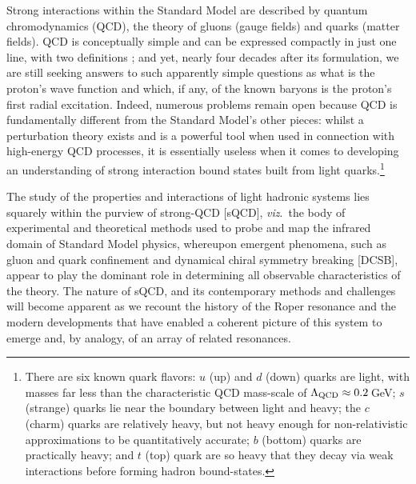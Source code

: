 Strong interactions within the Standard Model are described by quantum chromodynamics (QCD), the theory of gluons (gauge fields) and quarks (matter fields).   QCD is conceptually simple and can be expressed compactly in just one line, with two definitions \cite{Wilczek:2000ih}; and yet, nearly four decades after its formulation, we are still seeking answers to such apparently simple questions as what is the proton's wave function and which, if any, of the known baryons is the proton's first radial excitation.  Indeed, numerous problems remain open because QCD is fundamentally different from the Standard Model's other pieces: whilst a perturbation theory exists and is a powerful tool when used in connection with high-energy QCD processes, it is essentially useless when it comes to developing an understanding of strong interaction bound states built from light quarks.\footnote{There are six known quark flavors: $u$ (up) and $d$ (down) quarks are light, with masses far less than the characteristic QCD mass-scale of $\Lambda_{\rm QCD} \approx 0.2\,$GeV; $s$ (strange) quarks lie near the boundary between light and heavy; the $c$ (charm) quarks are relatively heavy, but not heavy enough for non-relativistic approximations to be quantitatively accurate; $b$ (bottom) quarks are practically heavy; and $t$ (top) quark are so heavy that they decay via weak interactions before forming hadron bound-states.}

The study of the properties and interactions of light hadronic systems lies squarely within the purview of strong-QCD [sQCD], \emph{viz}.\ the body of experimental and theoretical methods used to probe and map the infrared domain of Standard Model physics, whereupon emergent phenomena, such as gluon and quark confinement and dynamical chiral symmetry breaking [DCSB], appear to play the dominant role in determining all observable characteristics of the theory.  The nature of sQCD, and its contemporary methods and challenges will become apparent as we recount the history of the Roper resonance and the modern developments that have enabled a coherent picture of this system to emerge and, by analogy, of an array of related resonances.



